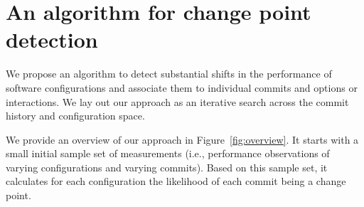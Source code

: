 \documentclass[sigconf]{acmart}
\begin{document}

	
	\section{An algorithm for change point detection}\label{sec:cpmodel}
	We propose an algorithm to detect substantial shifts in the performance of software configurations and associate them to individual commits and options or interactions. We lay out our approach as an iterative search across the commit history and configuration space. 
	
	We provide an overview of our approach in Figure~\ref{fig:overview}. 
	It starts with a small initial sample set of measurements (i.e., performance observations of varying configurations and varying commits). 
	Based on this sample set, it calculates for each configuration the likelihood of each commit being a change point. 
	
\end{document}
